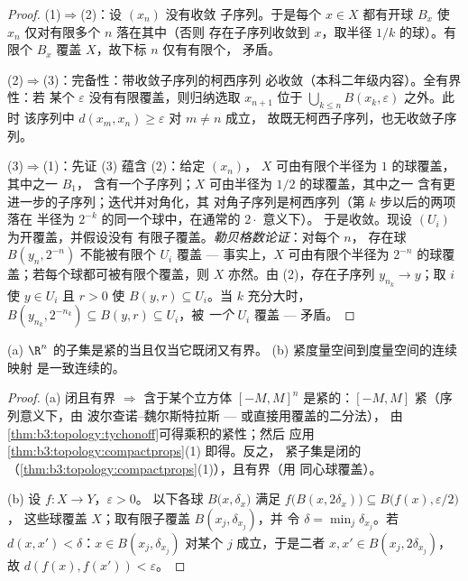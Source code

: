 \begin{proof}
(1)$\Rightarrow$(2)：设 $(x_n)$ 没有收敛
子序列。于是每个 $x \in X$ 都有开球 $B_x$
使 $x_n$ 仅对有限多个 $n$ 落在其中（否则
存在子序列收敛到 $x$，取半径 $1/k$ 的球）。有限个
$B_x$ 覆盖 $X$，故下标 $n$ 仅有有限个，
矛盾。

(2)$\Rightarrow$(3)：完备性：带收敛子序列的柯西序列
必收敛（本科二年级内容）。全有界性：若
某个 $\varepsilon$ 没有有限覆盖，则归纳选取
$x_{n+1}$ 位于 $\bigcup_{k\leq n} B(x_k, \varepsilon)$ 之外。此时
该序列中 $d(x_m, x_n) \geq \varepsilon$ 对 $m \neq n$ 成立，
故既无柯西子序列，也无收敛子序列。

(3)$\Rightarrow$(1)：先证 (3) 蕴含 (2)：给定 $(x_n)$，
$X$ 可由有限个半径为 $1$ 的球覆盖，其中之一 $B_1$，
含有一个子序列；$X$ 可由半径为 $1/2$ 的球覆盖，其中之一
含有更进一步的子序列；迭代并对角化，其
对角子序列是柯西序列（第 $k$ 步以后的两项落在
半径为 $2^{-k}$ 的同一个球中，在通常的 $2\cdot$ 意义下）。
于是收敛。现设 $(U_i)$ 为开覆盖，并假设没有
有限子覆盖。\emph{勒贝格数论证}：对每个 $n$，
存在球 $B(y_n, 2^{-n})$ 不能被有限个
$U_i$ 覆盖 --- 事实上，$X$ 可由有限个半径为
$2^{-n}$ 的球覆盖；若每个球都可被有限个覆盖，则 $X$ 亦然。由
(2)，存在子序列 $y_{n_k} \to y$；取 $i$ 使 $y \in U_i$
且 $r > 0$ 使 $B(y, r) \subseteq U_i$。当 $k$ 充分大时，
$B(y_{n_k}, 2^{-n_k}) \subseteq B(y, r) \subseteq U_i$，被
\emph{一个} $U_i$ 覆盖 --- 矛盾。
\end{proof}

\begin{corollary}[海涅–博雷尔；海涅]
\label{cor:b3:topology:heineborel}
(a) $\R^n$ 的子集是紧的当且仅当它既闭又有界。
(b) 紧度量空间到度量空间的连续映射
是一致连续的。
\end{corollary}

\begin{proof}
(a) 闭且有界 $\Rightarrow$ 含于某个立方体
$[-M,M]^n$ 是紧的：$[-M, M]$ 紧（序列意义下，由
波尔查诺–魏尔斯特拉斯 --- 或直接用覆盖的二分法），
由\cref{thm:b3:topology:tychonoff}可得乘积的紧性；然后
应用 \cref{thm:b3:topology:compactprops}(1) 即得。反之，
紧子集是闭的
（\cref{thm:b3:topology:compactprops}(1)），且有界（用
同心球覆盖）。

(b) 设 $f \colon X \to Y$，$\varepsilon > 0$。
以下各球 $B\bigl(x, \delta_x\bigr)$ 满足 $f\bigl(B(x,
2\delta_x)\bigr)\subseteq B\bigl(f(x), \varepsilon/2\bigr)$，
这些球覆盖 $X$；取有限子覆盖 $B(x_j, \delta_{x_j})$，并
令 $\delta = \min_j \delta_{x_j}$。若 $d(x, x') < \delta$：$x
\in B(x_j, \delta_{x_j})$ 对某个 $j$ 成立，于是二者 $x, x'
\in B(x_j, 2\delta_{x_j})$，故 $d(f(x), f(x')) < \varepsilon$。
\end{proof}

